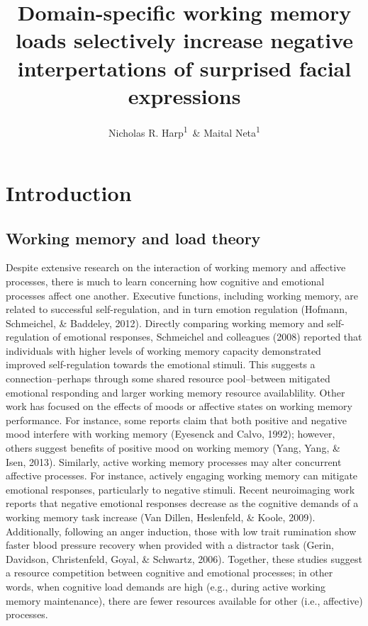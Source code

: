 \documentclass[man]{apa6}
\title{Domain-specific working memory loads selectively increase negative interpertations of surprised facial expressions}
\author{Nicholas R. Harp\textsuperscript{1}~\& Maital Neta\textsuperscript{1}}
\date{}
\affiliation{
\vspace{0.5cm}
\textsuperscript{1} University of Nebraska-Lincoln}
\begin{document}
\maketitle

\hypertarget{introduction}{%
\section{Introduction}\label{introduction}}

\hypertarget{working-memory-and-load-theory}{%
\subsection{Working memory and load theory}\label{working-memory-and-load-theory}}

Despite extensive research on the interaction of working memory and affective processes, there is much to learn concerning how cognitive and emotional processes affect one another. Executive functions, including working memory, are related to successful self-regulation, and in turn emotion regulation (Hofmann, Schmeichel, \& Baddeley, 2012). Directly comparing working memory and self-regulation of emotional responses, Schmeichel and colleagues (2008) reported that individuals with higher levels of working memory capacity demonstrated improved self-regulation towards the emotional stimuli. This suggests a connection--perhaps through some shared resource pool--between mitigated emotional responding and larger working memory resource availablility. Other work has focused on the effects of moods or affective states on working memory performance. For instance, some reports claim that both positive and negative mood interfere with working memory (Eyesenck and Calvo, 1992); however, others suggest benefits of positive mood on working memory (Yang, Yang, \& Isen, 2013). Similarly, active working memory processes may alter concurrent affective processes. For instance, actively engaging working memory can mitigate emotional responses, particularly to negative stimuli. Recent neuroimaging work reports that negative emotional responses decrease as the cognitive demands of a working memory task increase (Van Dillen, Heslenfeld, \& Koole, 2009). Additionally, following an anger induction, those with low trait rumination show faster blood pressure recovery when provided with a distractor task (Gerin, Davidson, Christenfeld, Goyal, \& Schwartz, 2006). Together, these studies suggest a resource competition between cognitive and emotional processes; in other words, when cognitive load demands are high (e.g., during active working memory maintenance), there are fewer resources available for other (i.e., affective) processes.
\end{document}

